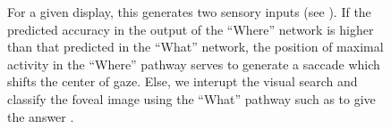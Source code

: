 \begin{figure}[t!]
{		\D
		For a given display, this generates two sensory inputs (see \B ).
		If the predicted accuracy in the output of the ``Where'' network is higher than that predicted in the ``What'' network, the position of maximal activity in the ``Where'' pathway serves to generate a saccade which shifts the center of gaze. Else, we interupt the visual search and classify the foveal image using the ``What'' pathway such as to give the answer \ANS . %
		\label{fig:methods}}%
\end{figure}%

